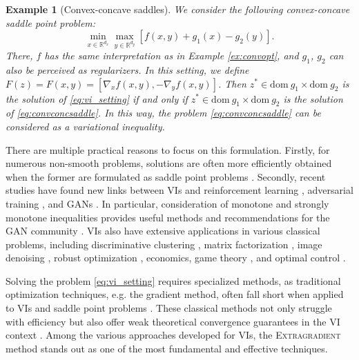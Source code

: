 \documentclass{article}
\newtheorem{example}{Example}
\begin{document}
\begin{example}[Convex-concave saddles]\label{ex:convconcsaddle}
    We consider the following convex-concave saddle point problem:
    \begin{equation}\label{eq:convconcsaddle}
        \underset{x\in \mathbb R^{d_x}}{\min}\underset{y\in \mathbb R^{d_y}}{\max} \left[f(x,y) + g_1(x) - g_2(y)\right].
    \end{equation}
    There, $f$ has the same interpretation as in Example \ref{ex:convopt}, and $g_1$, $g_2$ can also be perceived as regularizers. In this setting, we define $F(z) = F(x, y) = \left[\nabla_x f(x, y), -\nabla_y f(x, y)\right]$. Then $z^*\in \text{dom}~ g_1 \times \text{dom}~ g_2$ is the solution of \eqref{eq:vi_setting} if and only if $z^*\in \text{dom}~ g_1 \times \text{dom}~ g_2$ is the solution of \eqref{eq:convconcsaddle}. In this way, the problem \eqref{eq:convconcsaddle} can be considered as a variational inequality.
\end{example}

There are multiple practical reasons to focus on this formulation. Firstly, for numerous non-smooth problems, solutions are often more efficiently obtained when the former are formulated as saddle point problems \citep{nesterov2005smooth, nemirovski2004prox, chambolle2011first, esser2010general}. Secondly, recent studies have found new links between VIs and reinforcement learning \citep{omidshafiei2017deep, jin2020efficiently}, adversarial training \citep{madry2017towards}, and GANs \citep{goodfellow2014generative}. In particular, consideration of monotone and strongly monotone inequalities provides useful methods and recommendations for the GAN community \citep{daskalakis2017training, gidel2018variational, mertikopoulos2018optimistic, chavdarova2019reducing, liang2019interaction, peng2020training}. VIs also have extensive applications in various classical problems, including discriminative clustering \citep{xu2004maximum}, matrix factorization \citep{bach2008convex}, image denoising \citep{esser2010general, chambolle2011first}, robust optimization \citep{ben2009robust}, economics, game theory \citep{von1953theory}, and optimal control \citep{facchinei2003finite}. 

Solving the problem \eqref{eq:vi_setting} requires specialized methods, as traditional optimization techniques, e.g. the gradient method, often fall short when applied to VIs and saddle point problems \citep{harker1990finite}. These classical methods not only struggle with efficiency but also offer weak theoretical convergence guarantees in the VI context \citep{beznosikov2023smooth}. Among the various approaches developed for VIs, the \textsc{Extragradient} method \citep{korpelevich1976extragradient, mokhtari2020unified} stands out as one of the most fundamental and effective techniques.
\end{document}
